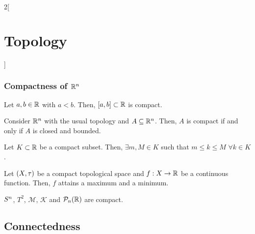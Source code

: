 \documentclass[../../../main_math.tex]{subfiles}
\begin{document}
\begin{multicols}{2}[\section{Topology}]
  \subsubsection{Compactness of \texorpdfstring{$\RR^n$}{Rn}}
  \begin{theorem}
    Let $a,b\in\RR$ with $a<b$. Then, $[a,b]\subset\RR$ is compact.
  \end{theorem}
  \begin{theorem}
    Consider $\RR^n$ with the usual topology and $A\subseteq \RR^n$. Then, $A$ is compact if and only if $A$ is closed and bounded.
  \end{theorem}
  \begin{lemma}
    Let $K\subset\RR$ be a compact subset. Then, $\exists m,M\in K$ such that $m\leq k\leq M$ $\forall k\in K$.
  \end{lemma}
  \begin{theorem}
    Let $(X,\topo)$ be a compact topological space and $f:X\rightarrow\RR$ be a continuous function. Then, $f$ attains a maximum and a minimum.
  \end{theorem}
  \begin{proposition}
    $\S^n$, $T^2$, $\mathcal{M}$, $\mathcal{K}$ and $\mathcal{P}_n(\RR)$ are compact.
  \end{proposition}
  \subsection{Connectedness}

\end{multicols}
\end{document}

